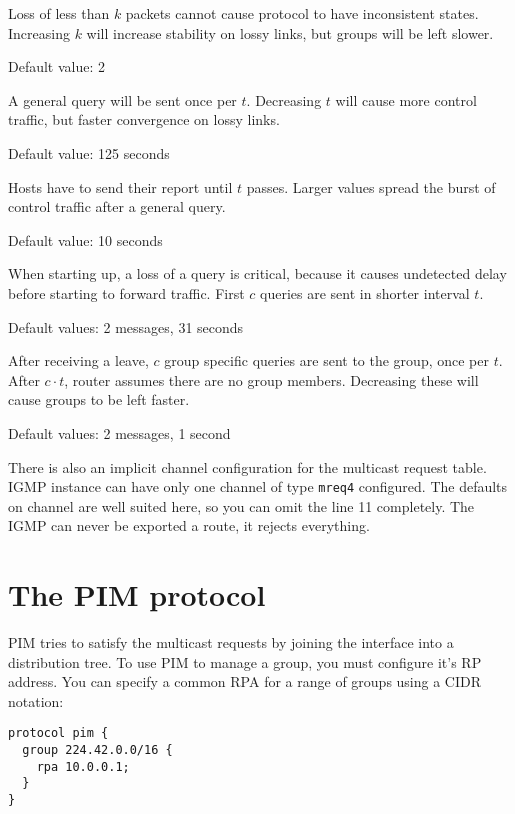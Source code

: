 \begin{description}[style=nextline]
\item[Robustness $k$]
  Loss of less than $k$ packets cannot cause protocol to have inconsistent
  states. Increasing $k$ will increase stability on lossy links, but groups
  will be left slower.

  Default value: 2

\item[Query interval $t$]
  A general query will be sent once per $t$. Decreasing $t$ will cause more
  control traffic, but faster convergence on lossy links.

  Default value: 125 seconds

\item[Query response interval $t$]
  Hosts have to send their report until $t$ passes. Larger values spread the
  burst of control traffic after a general query.

  Default value: 10 seconds

\item[Startup query count $c$, startup query interval $t$]
  When starting up, a loss of a query is critical, because it causes undetected
  delay before starting to forward traffic. First $c$ queries are sent in
  shorter interval $t$.

  Default values: 2 messages, 31 seconds

\item[Last member query count $c$, last member query interval $t$]
  After receiving a leave, $c$ group specific queries are sent to the group,
  once per $t$. After $c\cdot t$, router assumes there are no group members.
  Decreasing these will cause groups to be left faster.

  Default values: 2 messages, 1 second

\end{description}

There is also an implicit channel configuration for the multicast request
table. IGMP instance can have only one channel of type \texttt{mreq4}
configured. The defaults on channel are well suited here, so you can omit the
line 11 completely. The IGMP can never be exported a route, it rejects
everything.

\section{The PIM protocol}

PIM tries to satisfy the multicast requests by joining the interface into
a distribution tree. To use PIM to manage a group, you must configure it's RP
address. You can specify a common RPA for a range of groups using a CIDR
notation:
\begin{lstlisting}
protocol pim {
  group 224.42.0.0/16 {
    rpa 10.0.0.1;
  }
}
\end{lstlisting}

